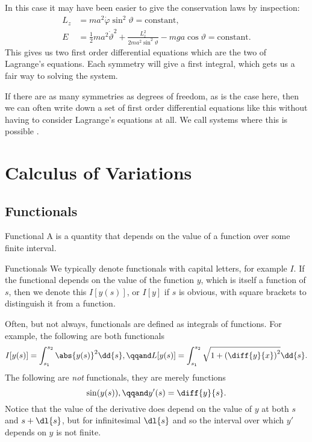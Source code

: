 \documentclass[fleqn]{NotesClass}
\begin{document}
    In this case it may have been easier to give the conservation laws by inspection:
    \begin{align}
        L_z &= ma^2 \dot{\varphi} \sin^2\vartheta = \text{constant},\\
        E &= \frac{1}{2}ma^2\dot{\vartheta}^2 + \frac{L_z^2}{2ma^2\sin^2\vartheta} - mga\cos\vartheta = \text{constant}.
    \end{align}
    This gives us two first order differential equations which are the two  of Lagrange's equations.
    Each symmetry will give a first integral, which gets us a fair way to solving the system.
    
    If there are as many symmetries as degrees of freedom, as is the case here, then we can often write down a set of first order differential equations like this without having to consider Lagrange's equations at all.
    We call systems where this is possible .
    
    \chapter{Calculus of Variations}
    \section{Functionals}
    \begin{dfn}{Functional}{}
        A  is a quantity that depends on the value of a function over some finite interval.
    \end{dfn}
    \begin{ntn}{Functionals}{}
        We typically denote functionals with capital letters, for example \(I\).
        If the functional depends on the value of the function \(y\), which is itself a function of \(s\), then we denote this \(I[y(s)]\), or \(I[y]\) if \(s\) is obvious, with square brackets to distinguish it from a function.
    \end{ntn}
    
    Often, but not always, functionals are defined as integrals of functions.
    For example, the following are both functionals
    \begin{equation}
        I[y(s)] = \int_{s_1}^{s_2} \abs{y(s)}^2 \dd{s}, \qqand L[y(s)] = \int_{s_1}^{s_2} \sqrt{1 + \left( \diff{y}{x} \right)^2} \dd{s}.
    \end{equation}
    The following are \emph{not} functionals, they are merely functions
    \begin{equation}
        \sin(y(s)), \qqand y'(s) = \diff{y}{s}.
    \end{equation}
    Notice that the value of the derivative does depend on the value of \(y\) at both \(s\) and \(s + \dl{s}\), but for infinitesimal \(\dl{s}\) and so the interval over which \(y'\) depends on \(y\) is not finite.
    
\end{document}
